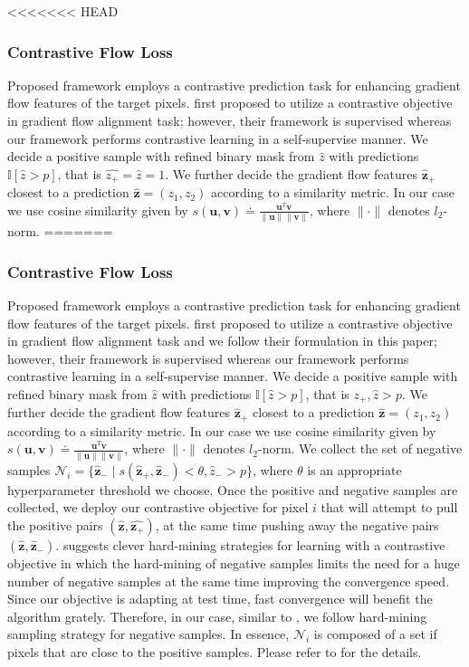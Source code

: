 <<<<<<< HEAD
\subsubsection{Contrastive Flow Loss}
Proposed framework employs a contrastive prediction task for enhancing gradient flow features of the target pixels. \cite{keaton2023celltranspose} first proposed to utilize a contrastive objective in gradient flow alignment task; however, their framework is supervised whereas our framework performs contrastive learning in a self-supervise manner. We decide a positive sample with refined binary mask from  $\hat{z}$ with predictions $\mathbb{I}[\hat{z}>p]$, that is $\hat{z_+}=\hat{z}=1$. We further decide the gradient flow features $\hat{\bm{z}}_+$ closest to a prediction  $\hat{\bm{z}} = (z_1,z_2)$ according to a similarity metric. In our case we use cosine similarity given by $s(\bm{u},\bm{v})\doteq\frac{\bm{u}^T\bm{v}}{\| \bm{u} \| \| \bm{v}\| }$, where $\| \cdot \|$ denotes $l_2$-norm.  
=======
\subsubsection{Contrastive Flow Loss} \label{sec:tta-cfl}
Proposed framework employs a contrastive prediction task for enhancing gradient flow features of the target pixels. \cite{keaton2023celltranspose} first proposed to utilize a contrastive objective in gradient flow alignment task and we follow their formulation in this paper; however, their framework is supervised whereas our framework performs contrastive learning in a self-supervise manner. We decide a positive sample with refined binary mask from  $\hat{z}$ with predictions $\mathbb{I}[\hat{z}>p]$, that is $\hat{z_+},\hat{z}>p$. We further decide the gradient flow features $\hat{\bm{z}}_+$ closest to a prediction  $\hat{\bm{z}} = (z_1,z_2)$ according to a similarity metric. In our case we use cosine similarity given by $s(\bm{u},\bm{v})\doteq\frac{\bm{u}^T\bm{v}}{\| \bm{u} \| \| \bm{v}\| }$, where $\| \cdot \|$ denotes $l_2$-norm.  We collect the set of negative samples $\mathcal{N}_i = \{ \hat{\bm{ z}}_- \; | \; s(\hat{\bm{ z}}_+,\hat{\bm{ z}}_-) < \theta, \hat{z}_- > p\}$, where $\theta$ is an appropriate hyperparameter threshold we choose. Once the positive and negative samples are collected, we deploy our contrastive objective for pixel $i$ that will attempt to pull the positive pairs $(\hat{\bm{z}}, \hat{\bm{z}_+})$, at the same time pushing away the negative pairs $(\hat{\bm{z}}, \hat{\bm{z}}_-)$.  \cite{wang2021understanding} suggests clever hard-mining strategies for learning with a contrastive objective in which the hard-mining of negative samples limits the need for a huge number of negative samples at the same time improving the convergence speed. Since our objective is adapting at test time, fast convergence will benefit the algorithm grately. Therefore, in our case, similar to \cite{keaton2023celltranspose}, we follow hard-mining sampling strategy for negative samples. In essence, $\mathcal{N}_i$ is composed of a set if pixels that are close to the positive samples. Please refer to  \cite{keaton2023celltranspose} for the details. \\

